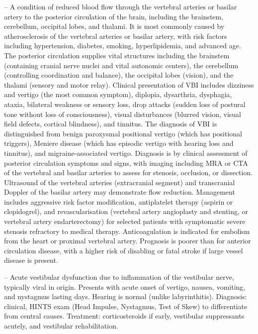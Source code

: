 -- A condition of reduced blood flow through the vertebral arteries or basilar artery to the posterior circulation of the brain, including the brainstem, cerebellum, occipital lobes, and thalami. It is most commonly caused by atherosclerosis of the vertebral arteries or basilar artery, with risk factors including hypertension, diabetes, smoking, hyperlipidemia, and advanced age. The posterior circulation supplies vital structures including the brainstem (containing cranial nerve nuclei and vital autonomic centers), the cerebellum (controlling coordination and balance), the occipital lobes (vision), and the thalami (sensory and motor relay). Clinical presentation of VBI includes dizziness and vertigo (the most common symptom), diplopia, dysarthria, dysphagia, ataxia, bilateral weakness or sensory loss, drop attacks (sudden loss of postural tone without loss of consciousness), visual disturbances (blurred vision, visual field defects, cortical blindness), and tinnitus. The diagnosis of VBI is distinguished from benign paroxysmal positional vertigo (which has positional triggers), Meniere disease (which has episodic vertigo with hearing loss and tinnitus), and migraine-associated vertigo. Diagnosis is by clinical assessment of posterior circulation symptoms and signs, with imaging including MRA or CTA of the vertebral and basilar arteries to assess for stenosis, occlusion, or dissection. Ultrasound of the vertebral arteries (extracranial segment) and transcranial Doppler of the basilar artery may demonstrate flow reduction. Management includes aggressive risk factor modification, antiplatelet therapy (aspirin or clopidogrel), and revascularisation (vertebral artery angioplasty and stenting, or vertebral artery endarterectomy) for selected patients with symptomatic severe stenosis refractory to medical therapy. Anticoagulation is indicated for embolism from the heart or proximal vertebral artery. Prognosis is poorer than for anterior circulation disease, with a higher risk of disabling or fatal stroke if large vessel disease is present.

-- Acute vestibular dysfunction due to inflammation of the vestibular nerve, typically viral in origin. Presents with acute onset of vertigo, nausea, vomiting, and nystagmus lasting days. Hearing is normal (unlike labyrinthitis). Diagnosis: clinical, HINTS exam (Head Impulse, Nystagmus, Test of Skew) to differentiate from central causes. Treatment: corticosteroids if early, vestibular suppressants acutely, and vestibular rehabilitation.

